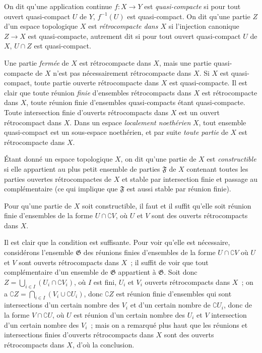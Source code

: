 \begin{definition}[9.1.1]
\label{0.9.1.1-fr}
On dit qu'une application continue $f:X\to Y$ est \emph{quasi-compacte} si
pour tout ouvert quasi-compact $U$ de $Y$, $f^{-1}(U)$ est quasi-compact. On
dit qu'une partie $Z$ d'un espace topologique $X$ est \emph{rétrocompacte
dans $X$} si l'injection canonique $Z\to X$ est quasi-compacte, autrement dit
si pour tout ouvert quasi-compact $U$ de $X$, $U\cap Z$ est quasi-compact.
\end{definition}

Une partie \emph{fermée} de $X$ est rétrocompacte dans $X$, mais une partie
quasi-compacte de $X$ n'est pas nécessairement rétrocompacte dans $X$. Si
$X$ est quasi-compact, toute partie ouverte rétrocompacte dans $X$ est
quasi-compacte. Il est clair que toute réunion \emph{finie} d'ensembles
rétrocompacts dans $X$ est rétrocompacte dans $X$, toute réunion finie
d'ensembles quasi-compacts étant quasi-compacte. Toute intersection finie
d'ouverts rétrocompacts dans $X$ est un ouvert rétrocompact dans $X$. Dans un
espace \emph{localement noethérien} $X$, tout ensemble quasi-compact est un
sous-espace noethérien, et par suite \emph{toute partie} de $X$ est
rétrocompacte dans $X$.

\begin{definition}[9.1.2]
\label{0.9.1.2-fr}
Étant donné un espace topologique $X$, on dit qu'une partie de $X$ est
\emph{constructible} si elle appartient au plus petit ensemble de parties
$\mathfrak{F}$ de $X$ contenant toutes les parties ouvertes rétrocompactes de
$X$ et stable par intersection finie et passage au complémentaire
(ce qui implique que $\mathfrak{F}$ est aussi stable par réunion finie).
\end{definition}

\begin{proposition}[9.1.3]
\label{0.9.1.3-fr}
Pour qu'une partie de $X$ soit constructible, il faut et il suffit qu'elle
soit réunion finie d'ensembles de la forme $U\cap\complement{V}$, où $U$ et
$V$ sont des ouverts rétrocompacts dans $X$.
\end{proposition}

Il est clair que la condition est suffisante. Pour voir qu'elle est
nécessaire, considérons l'ensemble $\mathfrak{G}$ des réunions finies
d'ensembles de la forme $U\cap\complement{V}$ où $U$ et $V$ sont ouverts
rétrocompacts dans $X$~; il suffit de voir que tout complémentaire d'un
ensemble de $\mathfrak{G}$ appartient à $\mathfrak{G}$. Soit donc
$Z=\bigcup_{i\in I}(U_i\cap\complement{V_i})$, où $I$ est fini, $U_i$ et
$V_i$ ouverts rétrocompacts dans $X$~; on a
$\complement{Z}=\bigcap_{i\in I}(V_i\cup\complement{U_i})$, donc
$\complement{Z}$ est réunion finie d'ensembles qui sont intersections d'un
certain nombre des $V_i$ et d'un certain nombre de $\complement{U_i}$, donc
de la forme
$V\cap\complement{U}$, où $U$ est réunion d'un certain nombre des $U_i$ et
$V$ intersection d'un certain nombre des $V_i$~; mais on a remarqué plus
haut que les réunions et intersections finies d'ouverts rétrocompacts dans
$X$ sont des ouverts rétrocompacts dans $X$, d'où la conclusion.

